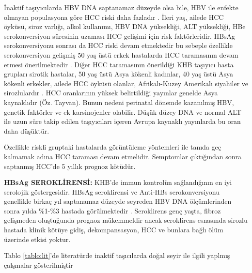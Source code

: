 İnaktif taşıyıcılarda HBV DNA saptanamaz düzeyde olsa bile, HBV ile enfekte olmayan populasyona göre HCC riski daha fazladır \cite{chen2010carriers}. İleri yaş, ailede HCC öyküsü, siroz varlığı, alkol kullanımı, HBV DNA yüksekliği, ALT yüksekliği, HBe serokonversiyon süresinin uzaması HCC gelişimi için risk faktörleridir. HBsAg serokonversiyonu sonrası da HCC riski devam etmektedir bu sebeple özellikle serokonversiyon gelişmiş 50 yaş üstü erkek hastalarda HCC taramasının devam etmesi önerilmektedir \cite{yip2017impact}. Diğer HCC taramasının önerildiği KHB taşıyıcı hasta grupları sirotik hastalar, 50 yaş üstü Asya kökenli kadınlar, 40 yaş üstü Asya kökenli erkekler, ailede HCC öyküsü olanlar, Afrikalı-Kuzey Amerikalı siyahiler ve sirozlulardır \cite{bruix2011management}. HCC oranlarının yüksek belirtildiği yayınlar genelde Asya kaynaklıdır (Öz. Tayvan). Bunun nedeni perinatal dönemde kazanılmış HBV, genetik faktörler ve ek karsinojenler olabilir. Düşük düzey DNA ve normal ALT ile uzun süre takip edilen taşıyıcıları içeren Avrupa kaynaklı yayınlarda bu oran daha düşüktür. 

Özellikle riskli gruptaki hastalarda görüntüleme yöntemleri ile tanıda geç kalmamak adına HCC taraması devam etmelidir. Semptomlar çıktığından sonra saptanmış HCC'de 5 yıllık prognoz kötüdür.




\textbf{HBsAg SEROKLİRENSİ:} KHB'de immun kontrolün sağlandığının en iyi serolojik göstergesidir. HBsAg seroklirensi ve Anti-HBs serokonversiyonu genellikle birkaç yıl saptanamaz düzeyde seyreden HBV DNA ölçümlerinden sonra yılda \%1-\%3 hastada görülmektedir \cite{martinot2002serum}.  Seroklirens genç yaşta, fibroz gelişmeden oluştuğunda prognoz mükemmeldir ancak seroklirens esnasında sirozlu hastada klinik kötüye gidiş, dekompansasyon, HCC ve bunlara bağlı ölüm üzerinde etkisi yoktur.   

Tablo \ref{tablo:lit}'de literatürde inaktif taşıcılarda doğal seyir ile ilgili yaplmış çalşmalar gösterilmiştir


